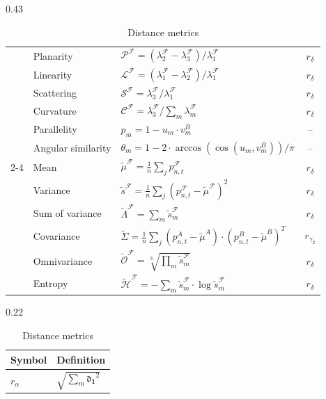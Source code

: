 \documentclass[final,3p,times,twocolumn]{elsarticle}
\begin{document}
\begin{table}[ht!]
\begin{subtable}[t]{0.43\textwidth}
{\begin{tabular}{cllc}
    ~ & Planarity & $\mathcal{P}^\mathcal{F} = (\lambda_2^\mathcal{F} - \lambda_3^\mathcal{F}) / \lambda_1^\mathcal{F}$ & $r_\delta$ \\
    ~ & Linearity & $\mathcal{L}^\mathcal{F} = (\lambda_1^\mathcal{F} - \lambda_2^\mathcal{F}) / \lambda_1^\mathcal{F}$ & $r_\delta$ \\
    ~ & Scattering & $\mathcal{S}^\mathcal{F} = \lambda_3^\mathcal{F} / \lambda_1^\mathcal{F}$ & $r_\delta$ \\
    ~ & Curvature & $\mathcal{C}^\mathcal{F} = \lambda_3^\mathcal{F} / \sum_m \lambda_m^\mathcal{F}$ & $r_\delta$ \\
    ~ & Parallelity & $p_m = 1 - u_m \cdot v_m^B$ & -- \\
    ~ & Angular similarity & $\theta_m = 1 - {2 \cdot \arccos(\cos(u_m, v_m^B))}/{\pi}$ & -- \\
    \cmidrule{2-4}
    \multirow{6}{*}{\rotatebox{90}{Textural}} & 
    Mean & $\tilde{\mu}^\mathcal{F} = \frac{1}{n} \sum_j p_{n,t}^\mathcal{F}$ & $r_\delta$ \\
    ~ & Variance & $\tilde{s}^\mathcal{F} = \frac{1}{n} \sum_j (p_{n,t}^\mathcal{F} - \tilde{\mu}^\mathcal{F})^2$ & $r_\delta$ \\
    ~ & Sum of variance & $\tilde{\Lambda}^\mathcal{F} = \sum_m \tilde{s}_m^\mathcal{F}$ & $r_\delta$ \\
    ~ & Covariance & $\tilde{\Sigma} = \frac{1}{n} \sum_j (p_{n,t}^A - \tilde{\mu}^A) \cdot (p_{n,t}^B - \tilde{\mu}^B)^T$ & $r_{\gamma_2}$ \\
    ~ & Omnivariance & $\tilde{\mathcal{O}}^\mathcal{F} = \sqrt[3]{\prod_m \tilde{s}_m^\mathcal{F}}$ & $r_\delta$ \\
    ~ & Entropy & $\tilde{\mathcal{H}}^\mathcal{F} = -\sum_m \tilde{s}_m^\mathcal{F} \cdot \log \tilde{s}_m^\mathcal{F}$ & $r_\delta$ \\
    \bottomrule
    \end{tabular}
    }
  \end{subtable}
\hfill
  \begin{subtable}[t]{0.22\textwidth}
    \centering
    \caption{Distance metrics}
    \label{tab_distance_metrics}
    {
    \begin{tabular}{ll}
    \toprule
    \textbf{Symbol} & \textbf{Definition} \\
    \midrule
    $r_\alpha$ & $\sqrt{\sum_m \mathbf{\mathfrak{d}_1}^2}$ \\

\end{tabular}}
\end{subtable}
\end{table}
\end{document}
